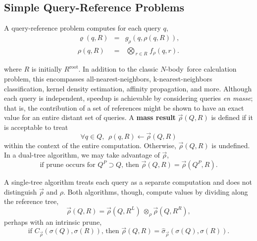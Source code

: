 \documentclass[times, leqno,twocolumn]{article}
\newcommand{\summary}{\hat{\sigma}}
\newcommand{\defterm}[1]{{\bf #1}}
\newcommand{\nbody}{$N$-body}
\newcommand{\kdroot}[1]{#1^{\text{root}}}
\newcommand{\kdleft}[1]{#1^{\!L}}
\newcommand{\kdright}[1]{#1^{\!R}}
\newcommand{\kdparent}[1]{#1^{\!P}}
\newcommand{\nameOp}[2]{\mathop{#1\nolimits\!\!_{#2}}}
\newcommand{\nameop}[2]{{\scriptstyle\:}#1_{\!#2}}
\newcommand{\myOp}[1]{\nameOp{\bigotimes}{#1}}
\newcommand{\myop}[1]{\nameop{\otimes}{#1}}
\newcommand{\letterqr}{\rho}
\newcommand{\outqr}{\varrho}
\newcommand{\inqr}{\rho}
\newcommand{\Opqr}{\myOp{\letterqr}}
\newcommand{\opqr}{\myop{\letterqr}}
\newcommand{\fqr}{f_{\!\letterqr}}
\newcommand{\gqr}{g_{\!\letterqr}}
\newcommand{\letterqrv}{\vec{\rho}}
\newcommand{\inqrv}{\vec{\rho}}
\newcommand{\deltaqrv}{\summary_{\!\letterqrv}}
\newcommand{\canpruneqrv}{C_{\!\letterqrv}}
\newcommand{\outstat}{\sigma}
\begin{document}

\subsection{Simple Query-Reference Problems}
A query-reference problem computes for each query $q$,
\begin{eqnarray*}
\outqr(q, R) &=& \gqr(q, \inqr(q, R)),
\\
\inqr(q, R) &=& \Opqr_{r \in R} \fqr(q, r).
\end{eqnarray*}

\noindent where $R$ is initially $\kdroot{R}$.
In addition to the classic \nbody\ force calculation problem, this encompasses all-nearest-neighbors, k-nearest-neighbors classification, kernel density estimation, affinity propagation, and more.
 Although each query is independent, speedup is achievable by considering queries {\it en masse}; that is, the contribution of a set of references might be shown to have an exact value for an entire distant set of queries.
A \defterm{mass result} $\inqrv(Q, R)$ is defined if it is acceptable to treat
\[
\forall q \in Q,~~ \inqr(q, R) \gets \inqrv(Q, R)
\]
\noindent within the context of the entire computation.
Otherwise, $\inqrv(Q,R)$ is undefined.
In a dual-tree algorithm, we may take advantage of $\inqrv$,
\begin{equation*}
\text{if prune occurs for } \kdparent{Q} \supset Q \text{, then } \inqrv(Q, R) = \inqrv(\kdparent{Q}, R).
\label{eqn:parentqrv}
\end{equation*}

\noindent
A single-tree algorithm treats each query as a separate computation and does not distinguish $\inqrv$ and $\inqr$.
Both algorithms, though, compute values by dividing along the reference tree,
\begin{equation*}
\inqrv(Q, R) = \inqrv(Q, \kdleft{R}) \opqr \inqrv(Q, \kdright{R}),
\label{eqn:dividepi}
\end{equation*}
\noindent perhaps with an intrinsic prune,
\begin{equation*}
\text{if } \canpruneqrv(\outstat(Q), \outstat(R)) \text{, then } \inqrv(Q, R) = \deltaqrv(\outstat(Q), \outstat(R)).
\label{eqn:prunepi}
\end{equation*}
\end{document}
